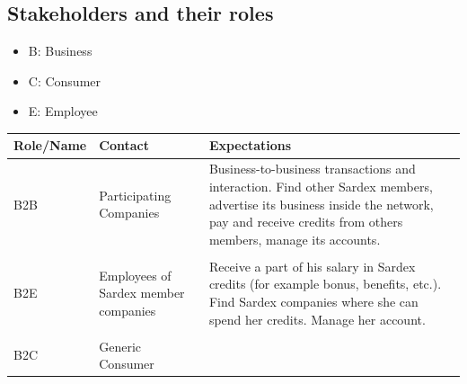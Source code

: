 \subsection{Stakeholders and their roles}\label{_stakeholders}
\begin{itemize}
	\item B:  Business
	\item C:  Consumer
	\item E:  Employee	
\end{itemize}

{\small
\begin{longtable}[]{@{}lll@{}}
\toprule
\begin{minipage}[b]{0.18\columnwidth}\raggedright\strut
Role/Name\strut
\end{minipage} & \begin{minipage}[b]{0.25\columnwidth}\raggedright\strut
Contact\strut
\end{minipage} & \begin{minipage}[b]{0.45\columnwidth}\raggedright\strut
Expectations\strut
\end{minipage}\tabularnewline
\midrule
\endhead
\begin{minipage}[t]{0.18\columnwidth}B2B \end{minipage} &
\begin{minipage}[t]{0.25\columnwidth}Participating Companies \end{minipage} &
\begin{minipage}[t]{0.45\columnwidth}Business-to-business transactions and interaction. Find other Sardex members, advertise its business inside the network, pay and receive credits from others members, manage its accounts.\end{minipage}
\tabularnewline
\tabularnewline
\begin{minipage}[t]{0.18\columnwidth}B2E \end{minipage} &
\begin{minipage}[t]{0.25\columnwidth}Employees of Sardex member companies\end{minipage} &
\begin{minipage}[t]{0.45\columnwidth}Receive a part of his salary in Sardex credits (for example bonus, benefits, etc.). Find Sardex companies where she can spend her credits. Manage her account.\end{minipage}
\tabularnewline
\tabularnewline
\begin{minipage}[t]{0.18\columnwidth}B2C \end{minipage} &
\begin{minipage}[t]{0.25\columnwidth}Generic Consumer \end{minipage} &

\end{longtable}}
